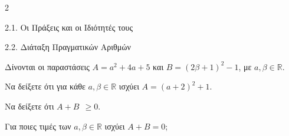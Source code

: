 \begin{ylh}{2}
    \item 2.1. Οι Πράξεις και οι Ιδιότητές τους
    \item 2.2. Διάταξη Πραγματικών Αριθμών
\end{ylh}
Δίνονται οι παραστάσεις $A = a^{2} + 4a + 5$ και $B = (2\beta + 1)^{2} - 1$, με $a,\beta\mathbb{\in R}$.
\begin{alist}
\item Να δείξετε ότι για κάθε $a,\beta\mathbb{\in R}$ ισχύει $A = (a + 2)^{2} + 1$.
\item
\begin{rlist}
\item Να δείξετε ότι $A+B\ \  \geq 0$.
\item Για ποιες τιμές των $a,\beta\mathbb{\in R}$ ισχύει $A+B = 0$;
\end{rlist}
\end{alist}

